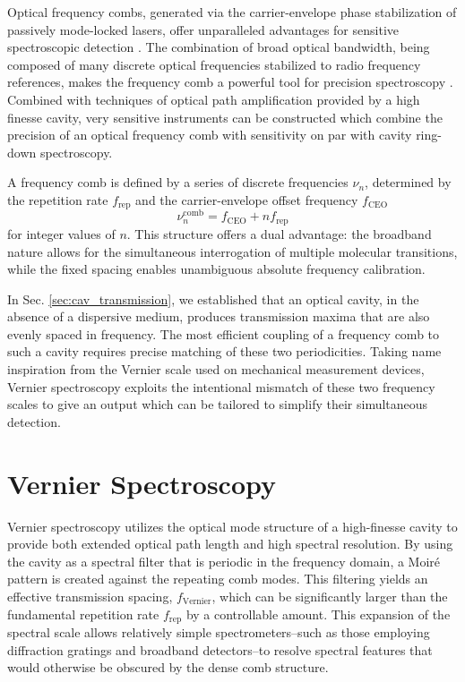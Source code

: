 \documentclass[12pt]{report}
\begin{document}
	Optical frequency combs, generated via the carrier-envelope phase stabilization of passively mode-locked lasers, offer unparalleled advantages for sensitive spectroscopic detection \cite{book_ceas}. The combination of broad optical bandwidth, being composed of many discrete optical frequencies stabilized to radio frequency references, makes the frequency comb a powerful tool for precision spectroscopy \cite{book_yeCundifff_combs}. Combined with techniques of optical path amplification provided by a high finesse cavity, very sensitive instruments can be constructed which combine the precision of an optical frequency comb with sensitivity on par with cavity ring-down spectroscopy.
	
	A frequency comb is defined by a series of discrete frequencies $\nu_n$, determined by the repetition rate $f_{\text{rep}}$ and the carrier-envelope offset frequency $f_{\text{CEO}}$
	\begin{equation} \label{comb_modes}
		\nu^\mathrm{comb}_n = f_{\text{CEO}} + n f_{\text{rep}}
	\end{equation}
	for integer values of $n$. This structure offers a dual advantage: the broadband nature allows for the simultaneous interrogation of multiple molecular transitions, while the fixed spacing enables unambiguous absolute frequency calibration.
	
	In Sec. \ref{sec:cav_transmission}, we established that an optical cavity, in the absence of a dispersive medium, produces transmission maxima that are also evenly spaced in frequency. The most efficient coupling of a frequency comb to such a cavity requires precise matching of these two periodicities. Taking name inspiration from the Vernier scale used on mechanical measurement devices, Vernier spectroscopy exploits the intentional mismatch of these two frequency scales to give an output which can be tailored to simplify their simultaneous detection.
	
	\section{Vernier Spectroscopy}
	
	Vernier spectroscopy utilizes the optical mode structure of a high-finesse cavity to provide both extended optical path length and high spectral resolution. By using the cavity as a spectral filter that is periodic in the frequency domain, a Moiré pattern is created against the repeating comb modes. This filtering yields an effective transmission spacing, $f_{\text{Vernier}}$, which can be significantly larger than the fundamental repetition rate $f_{\text{rep}}$ by a controllable amount. This expansion of the spectral scale allows relatively simple spectrometers--such as those employing diffraction gratings and broadband detectors--to resolve spectral features that would otherwise be obscured by the dense comb structure.
	
\end{document}
